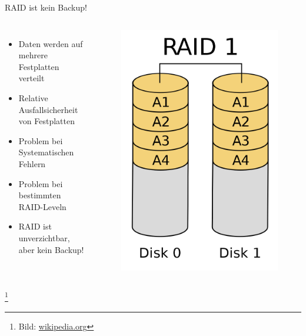 \documentclass[10pt]{beamer}
\newcommand\blfootnote[1]{%
	\begingroup
	\renewcommand\thefootnote{}\footnote{#1}%
	\addtocounter{footnote}{-1}%
	\endgroup
}
\begin{document}
%
%
\begin{frame}[fragile]{RAID ist kein Backup!}
\begin{columns}[T,c,onlytextwidth]
	\begin{itemize}
		\item Daten werden auf mehrere Festplatten verteilt
		\item Relative Ausfallsicherheit von Festplatten
		\item Problem bei Systematischen Fehlern
		\item Problem bei bestimmten RAID-Leveln
		\item RAID ist unverzichtbar, aber kein Backup!
	\end{itemize}
	\begin{figure}
		\includegraphics[width=1\textwidth]{images/RAID_1}
	\end{figure}
\end{columns}
	\blfootnote{Bild: \href{https://de.wikipedia.org}{wikipedia.org}}
\end{frame}
\end{document}
